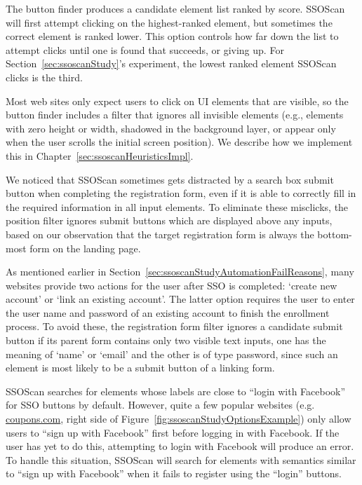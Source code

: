  The button finder produces a candidate element list ranked by score.  SSOScan will first attempt clicking on the highest-ranked element, but sometimes the correct element is ranked lower.  This option controls how far down the list to attempt clicks until one is found that succeeds, or giving up.  For Section~\ref{sec:ssoscanStudy}'s experiment, the lowest ranked element SSOScan clicks is the third.

 Most web sites only expect users to click on UI elements that are visible, so the button finder includes a filter that ignores all invisible elements (e.g., elements with zero height or width, shadowed in the background layer, or appear only when the user scrolls the initial screen position).  We describe how we implement this in Chapter~\ref{sec:ssoscanHeuristicsImpl}.  %

 We noticed that SSOScan sometimes gets distracted by a search box submit button when completing the registration form, even if it is able to correctly fill in the required information in all input elements.  To eliminate these misclicks, the position filter ignores submit buttons which are displayed above any inputs, based on our observation that the target registration form is always the bottom-most form on the landing page.

 As mentioned earlier in Section~\ref{sec:ssoscanStudyAutomationFailReasons}, many websites provide two actions for the user after SSO is completed: `create new account' or `link an existing account'.  The latter option requires the user to enter the user name and password of an existing account to finish the enrollment process.  To avoid these, the registration form filter ignores a candidate submit button if its parent form contains only two visible text inputs, one has the meaning of `name' or `email' and the other is of type password, since such an element is most likely to be a submit button of a linking form.

 SSOScan searches for elements whose labels are close to ``login with Facebook'' for SSO buttons by default.  However, quite a few popular websites (e.g. \url{coupons.com}, right side of Figure~\ref{fig:ssoscanStudyOptionsExample}) only allow users to ``sign up with Facebook'' first before logging in with Facebook.  If the user has yet to do this, attempting to login with Facebook will produce an error.  To handle this situation, SSOScan will search for elements with semantics similar to ``sign up with Facebook'' when it fails to register using the ``login'' buttons.

